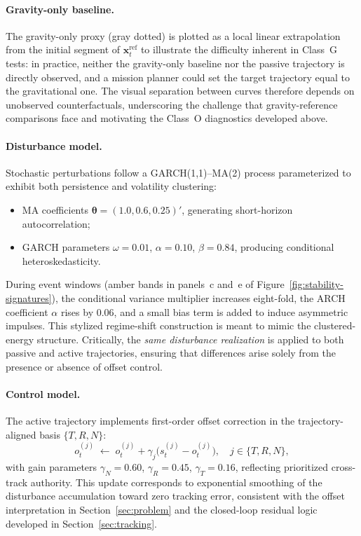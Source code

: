 \documentclass{article}
\begin{document}
\paragraph{Gravity-only baseline.}
The gravity-only proxy (gray dotted) is plotted as a local linear extrapolation from the initial segment of $\mathbf{x}_t^{\mathrm{ref}}$ to illustrate the difficulty inherent in Class~G tests: in practice, neither the gravity-only baseline nor the passive trajectory is directly observed, and a mission planner could set the target trajectory equal to the gravitational one. The visual separation between curves therefore depends on unobserved counterfactuals, underscoring the challenge that gravity-reference comparisons face and motivating the Class~O diagnostics developed above.


\paragraph{Disturbance model.}
Stochastic perturbations follow a GARCH(1,1)--MA(2) process parameterized to exhibit both persistence and volatility clustering:
\begin{itemize}
    \item MA coefficients $\boldsymbol{\theta} = (1.0, 0.6, 0.25)'$, generating short-horizon autocorrelation;
    \item GARCH parameters $\omega = 0.01$, $\alpha = 0.10$, $\beta = 0.84$, producing conditional heteroskedasticity.
\end{itemize}
During event windows (amber bands in panels~c and~e of Figure~\ref{fig:stability-signatures}), the conditional variance multiplier increases eight-fold, the ARCH coefficient $\alpha$ rises by $0.06$, and a small bias term is added to induce asymmetric impulses. This stylized regime-shift construction is meant to mimic the clustered-energy structure. Critically, the \emph{same disturbance realization} is applied to both passive and active trajectories, ensuring that differences arise solely from the presence or absence of offset control.


\paragraph{Control model.}
The active trajectory implements first-order offset correction in the trajectory-aligned basis $\{T,R,N\}$:
\begin{equation}
    o_t^{(j)} \;\leftarrow\; o_t^{(j)} + \gamma_j \bigl(s_t^{(j)} - o_t^{(j)}\bigr),
    \quad j \in \{T, R, N\},
    \label{eq:control_update}
\end{equation}
with gain parameters $\gamma_N = 0.60$, $\gamma_R = 0.45$, $\gamma_T = 0.16$, reflecting prioritized cross-track authority. This update corresponds to exponential smoothing of the disturbance accumulation toward zero tracking error, consistent with the offset interpretation in Section~\ref{sec:problem} and the closed-loop residual logic developed in Section~\ref{sec:tracking}.
\end{document}
